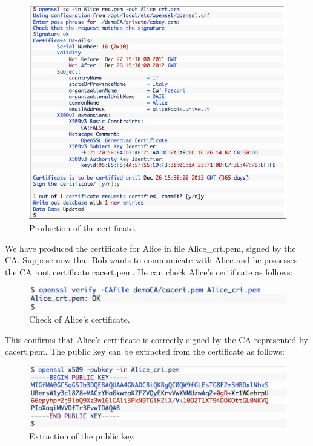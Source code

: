 \documentclass[a4paper, 12pt]{report}
\begin{document}
\begin{figure}[H]
	\centering
	\includegraphics[scale=0.65]{images/Lec23/cert4.png}
	\caption{Production of the certificate.}
	\label{fig:cert4}
\end{figure}

We have produced the certificate for Alice in file Alice\_crt.pem, signed by the CA. Suppose now that Bob wants to communicate with Alice and he possesses the CA root certificate cacert.pem. He can check Alice's certificate as follows:

\begin{figure}[H]
	\centering
	\includegraphics[scale=0.65]{images/Lec23/cert5.png}
	\caption{Check of Alice's certificate.}
	\label{fig:cert5}
\end{figure}

This confirms that Alice's certificate is correctly signed by the CA represented by cacert.pem. The public key can be extracted from the certificate as follows:

\begin{figure}[H]
	\centering
	\includegraphics[scale=0.65]{images/Lec23/cert6.png}
	\caption{Extraction of the public key.}
	\label{fig:cert6}
\end{figure}
\end{document}
